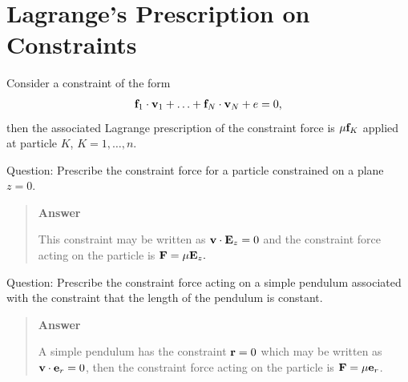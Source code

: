 \documentclass[
  letterpaper,
  DIV=11,
  numbers=noendperiod]{scrreprt}
\providecommand{\hdots}{\ldots}
\begin{document}
\section{Lagrange's Prescription on
Constraints}\label{lagranges-prescription-on-constraints}

Consider a constraint of the form \begin{align*}
    {\bf f}_1\cdot{\bf v}_1+\hdots+{\bf f}_N\cdot{\bf v}_N + e = 0,
\end{align*} then the associated Lagrange prescription of the constraint
force is \(\mu{\bf f}_K\) applied at particle \(K\), \(K=1,\hdots,n\).

\begin{tcolorbox}[enhanced jigsaw, arc=.35mm, bottomrule=.15mm, bottomtitle=1mm, breakable, colback=white, colbacktitle=quarto-callout-tip-color!10!white, colframe=quarto-callout-tip-color-frame, coltitle=black, left=2mm, leftrule=.75mm, opacityback=0, opacitybacktitle=0.6, rightrule=.15mm, title=\textcolor{quarto-callout-tip-color}{\faLightbulb}\hspace{0.5em}{Think!}, titlerule=0mm, toprule=.15mm, toptitle=1mm]

Question: Prescribe the constraint force for a particle constrained on a
plane \(z = 0\).

\begin{quote}
\textbf{Answer}

This constraint may be written as \({\bf v}\cdot{\bf E}_z = 0\) and the
constraint force acting on the particle is \({\bf F} = \mu{\bf E}_z.\)
\end{quote}

\end{tcolorbox}

\begin{tcolorbox}[enhanced jigsaw, arc=.35mm, bottomrule=.15mm, bottomtitle=1mm, breakable, colback=white, colbacktitle=quarto-callout-tip-color!10!white, colframe=quarto-callout-tip-color-frame, coltitle=black, left=2mm, leftrule=.75mm, opacityback=0, opacitybacktitle=0.6, rightrule=.15mm, title=\textcolor{quarto-callout-tip-color}{\faLightbulb}\hspace{0.5em}{Think!}, titlerule=0mm, toprule=.15mm, toptitle=1mm]

Question: Prescribe the constraint force acting on a simple pendulum
associated with the constraint that the length of the pendulum is
constant.

\begin{quote}
\textbf{Answer}

A simple pendulum has the constraint \({\bf r} = 0\) which may be
written as \({\bf v}\cdot{\bf e}_r = 0\), then the constraint force
acting on the particle is \({\bf F} = \mu{\bf e}_r\).
\end{quote}

\end{tcolorbox}
\end{document}
